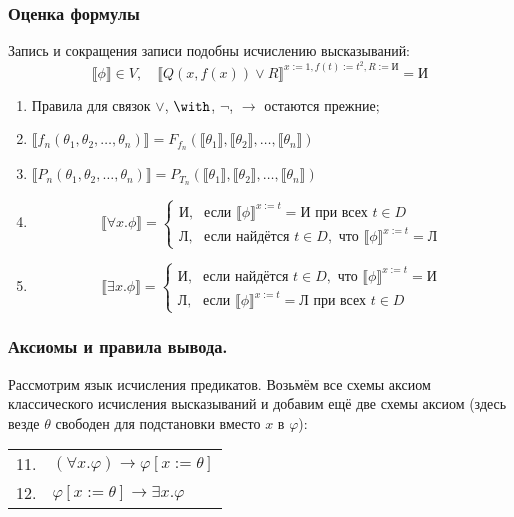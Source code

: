 \documentclass[10pt,a4paper,oneside]{article}
\begin{document}
\subsubsection{Оценка формулы}

Запись и сокращения записи подобны исчислению высказываний: $$\llbracket \phi \rrbracket \in V,\quad
      \llbracket Q(x,f(x))\vee R\rrbracket^{x := 1, f(t) := t^2, R := \text{И}} = \text{И}$$

\begin{enumerate}
\item Правила для связок $\vee$, $\with$, $\neg$, $\rightarrow$ остаются прежние;
\item $\llbracket f_n (\theta_1, \theta_2, \dots, \theta_n) \rrbracket = F_{f_n} (\llbracket\theta_1\rrbracket,
          \llbracket\theta_2\rrbracket, \dots, \llbracket\theta_n\rrbracket)$
\item $\llbracket P_n (\theta_1, \theta_2, \dots, \theta_n) \rrbracket = P_{T_n} (\llbracket\theta_1\rrbracket,
          \llbracket\theta_2\rrbracket, \dots, \llbracket\theta_n\rrbracket)$
\item $$\llbracket \forall x.\phi \rrbracket = \left\{\begin{array}{ll}
   \text{И}, & \text{если } \llbracket\phi\rrbracket^{x := t} = \text{И}\text{ при всех } t \in D\\
   \text{Л}, & \text{если найдётся } t \in D, \text{ что } \llbracket\phi\rrbracket^{x := t} = \text{Л}
  \end{array}\right.$$
\item $$\llbracket \exists x.\phi \rrbracket = \left\{\begin{array}{ll}
   \text{И}, & \text{если найдётся } t \in D, \text{ что } \llbracket\phi\rrbracket^{x := t} = \text{И}\\
   \text{Л}, & \text{если } \llbracket\phi\rrbracket^{x := t} = \text{Л}\text{ при всех } t \in D
  \end{array}\right.$$
\end{enumerate}

\subsubsection{Аксиомы и правила вывода.}
Рассмотрим язык исчисления предикатов. Возьмём все схемы аксиом классического исчисления высказываний и добавим ещё две схемы аксиом 
(здесь везде $\theta$ свободен для подстановки вместо $x$ в $\varphi$):

\begin{tabular}{ll}
11. & $(\forall x.\varphi) \rightarrow \varphi[x:=\theta]$\\
12. & $\varphi[x:=\theta] \rightarrow \exists x.\varphi$ 
\end{tabular}
\end{document}
